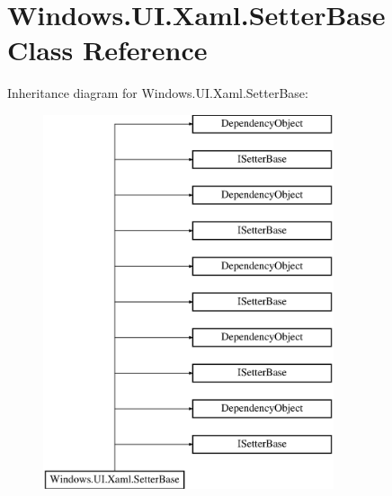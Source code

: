 \hypertarget{class_windows_1_1_u_i_1_1_xaml_1_1_setter_base}{}\section{Windows.\+U\+I.\+Xaml.\+Setter\+Base Class Reference}
\label{class_windows_1_1_u_i_1_1_xaml_1_1_setter_base}
Inheritance diagram for Windows.\+U\+I.\+Xaml.\+Setter\+Base\+:\begin{figure}[H]
\begin{center}
\leavevmode
\includegraphics[height=11.000000cm]{class_windows_1_1_u_i_1_1_xaml_1_1_setter_base}
\end{center}
\end{figure}
